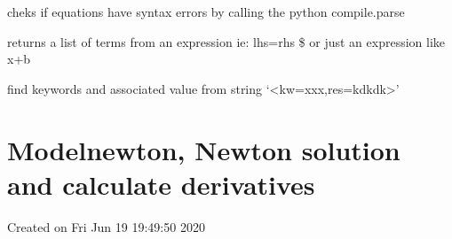 \documentclass[letterpaper,10pt,english]{sphinxmanual}
\begin{document}

\begin{fulllineitems}
\label{\detokenize{index:modelpattern.check_syntax_model}}
\pysigstartsignatures
{}
\pysigstopsignatures
\sphinxAtStartPar
cheks if equations have syntax errors by calling the python compile.parse

\end{fulllineitems}


\begin{fulllineitems}
\label{\detokenize{index:modelpattern.udtryk_parse}}
\pysigstartsignatures
{}
\pysigstopsignatures
\sphinxAtStartPar
returns a list of terms from an expression ie: lhs=rhs \$
or just an expression like x+b

\end{fulllineitems}


\begin{fulllineitems}
\label{\detokenize{index:modelpattern.kw_frml_name}}
\pysigstartsignatures
{}
\pysigstopsignatures
\sphinxAtStartPar
find keywords and associated value from string ‘\textless{}kw=xxx,res=kdkdk\textgreater{}’

\end{fulllineitems}



\section{Modelnewton, Newton solution and calculate derivatives}
\label{\detokenize{index:module-modelnewton}}\label{\detokenize{index:modelnewton-newton-solution-and-calculate-derivatives}}
\sphinxAtStartPar
Created on Fri Jun 19 19:49:50 2020
\end{document}
